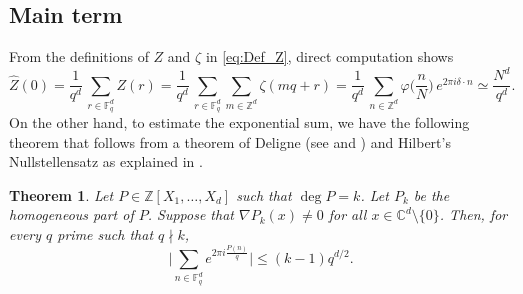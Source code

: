 \documentclass[11pt,reqno]{amsart}
\newtheorem{thm}{Theorem}[section]
\theoremstyle{definition}
\numberwithin{equation}{section}
\theoremstyle{remark}
\begin{document}
\subsection*{Main term}
From the definitions of $Z$ and $\zeta$ in \eqref{eq:Def_Z}, direct computation shows 
\begin{equation}\label{eq:Z_Hat_0}
    \widehat Z(0) 
    = \frac{1}{q^d} \,  \sum_{r  \in \mathbb F_q^d} Z(r) 
    = \frac{1}{q^d} \,  \sum_{r  \in \mathbb F_q^d} \sum_{m \in \mathbb Z^d}  \zeta(mq+r)
    = \frac{1}{q^d} \, \sum_{n \in \mathbb Z^d}  \varphi\Big( \frac{n}{N} \Big) \, e^{2\pi i \delta \cdot n} 
    \simeq \frac{N^d}{q^d}. 
\end{equation}
On the other hand, 
to estimate the exponential sum, we have the following theorem
that follows from a theorem of Deligne (see \cite[Theorem 8.4]{Deligne1974} and \cite[Theorem 11.43]{IwaniecKowalski2004})
and Hilbert's Nullstellensatz as explained in \cite[Corollary 3.2]{EceizabarrenaPonceVanegas2022}.
\begin{thm}\label{thm:Estimate_Weil_Sums}
    Let $P \in \mathbb Z[X_1, \ldots, X_d]$ such that $\deg P = k$. 
    Let $P_k$ be the homogeneous part of $P$. 
    Suppose that $\nabla P_k(x) \neq 0$ for all $x \in \mathbb C^d \setminus \{0\}$. 
    Then, for every $q$ prime such that $q \nmid k$, 
    \begin{equation}
        \Big| \sum_{n \in \mathbb F_q^d} e^{2\pi i \frac{P(n)}{q}} \Big| \leq (k-1) q^{d/2}.
    \end{equation}
\end{thm}  
\end{document}

